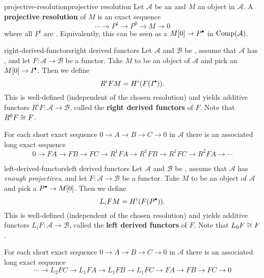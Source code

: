 \begin{topic}{projective-resolution}{projective resolution}
    Let $\mathcal{A}$ be an  and $M$ an object in $\mathcal{A}$. A \textbf{projective resolution} of $M$ is an exact sequence
    \[ \cdots \to P^1 \to P^0 \to M \to 0 \]
    where all $P^i$ are . Equivalently, this can be seen as a  $M[0] \to P^\bdot$ in $\textup{Comp}(\mathcal{A})$.
\end{topic}

\begin{topic}{right-derived-functors}{right derived functors}
    Let $\mathcal{A}$ and $\mathcal{B}$ be , assume that $\mathcal{A}$ has , and let $F \colon \mathcal{A} \to \mathcal{B}$ be a  functor. Take $M$ to be an object of $\mathcal{A}$ and pick an  $M[0] \to I^\bdot$. Then we define
    \[ R^i F M = H^i(F(I^\bdot)) . \]
    This is well-defined (independent of the chosen resolution) and yields additive functors $R^i F \colon \mathcal{A} \to \mathcal{B}$, called the \textbf{right derived functors} of $F$. Note that $R^0 F \cong F$.
    
    For each short exact sequence $0 \to A \to B \to C \to 0$ in $\mathcal{A}$ there is an associated long exact sequence
    \[ 0 \to FA \to FB \to FC \to R^1FA \to R^1FB \to R^1FC \to R^2FA \to \cdots \]
\end{topic}

\begin{topic}{left-derived-functors}{left derived functors}
    Let $\mathcal{A}$ and $\mathcal{B}$ be , assume that $\mathcal{A}$ has \textit{enough projectives}, and let $F \colon \mathcal{A} \to \mathcal{B}$ be a  functor. Take $M$ to be an object of $\mathcal{A}$ and pick a  $P^\bdot \to M[0]$. Then we define
    \[ L_i F M = H^i(F(P^\bdot)) . \]
    This is well-defined (independent of the chosen resolution) and yields additive functors $L_i F \colon \mathcal{A} \to \mathcal{B}$, called the \textbf{left derived functors} of $F$. Note that $L_0 F \cong F$.
    
    For each short exact sequence $0 \to A \to B \to C \to 0$ in $\mathcal{A}$ there is an associated long exact sequence
    \[ \cdots \to L_2 FC \to L_1 FA \to L_1 FB \to L_1 FC \to FA \to FB \to FC \to 0 \]
\end{topic}

